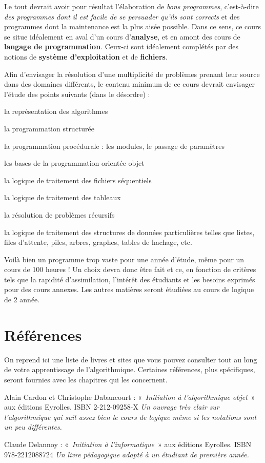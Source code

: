 	Le tout devrait avoir pour résultat l’élaboration de \textit{bons
	programmes}, c’est-à-dire \textit{des programmes dont il est facile de
	se persuader qu’ils sont corrects} et des programmes dont la
	maintenance est la plus aisée possible. Dans ce sens, ce cours se situe
	idéalement en aval d’un cours d’\textbf{analyse}, et en amont des cours
	de \textbf{langage de programmation}. Ceux-ci sont idéalement complétés
	par des notions de \textbf{système d’exploitation} et de
	\textbf{fichiers}.

	Afin d’envisager la résolution d’une multiplicité de problèmes prenant
	leur source dans des domaines différents, le contenu minimum de ce
	cours devrait envisager l’étude des points suivants (dans le désordre)
	:

	\begin{liste}
	\item 
		la représentation des algorithmes
	\item
		la programmation structurée
	\item
		la programmation procédurale : les modules, le passage de paramètres
	\item
		les bases de la programmation orientée objet
	\item
		la logique de traitement des fichiers séquentiels
	\item
		la logique de traitement des tableaux
	\item
		la résolution de problèmes récursifs
	\item
		la logique de traitement des structures de données particulières telles
		que listes, files d’attente, piles, arbres, graphes, tables de hachage,
		etc.
	\end{liste}

	Voilà bien un programme trop vaste pour une année d’étude, même pour un
	cours de 100 heures ! Un choix devra donc être fait et ce, en fonction
	de critères tels que la rapidité d’assimilation, l’intérêt des
	étudiants et les besoins exprimés pour des cours annexes. Les autres
	matières seront étudiées au cours de logique de 2
	année.

\section{Références}
	
	On reprend ici une liste de livres et sites que vous pouvez consulter
	tout au long de votre apprentissage de
	l'algorithmique. Certaines références, plus
	spécifiques, seront fournies avec les chapitres qui les concernent.

	\begin{liste}
	\item 
		Alain Cardon et Christophe Dabancourt : «~\textit{Initiation à
		l'algorithmique objet}~» aux éditions Eyrolles. ISBN
		2-212-09258-X
		\textit{Un ouvrage très clair sur l'algorithmique qui
		suit assez bien le cours de logique même si les notations sont un peu
		différentes.}
	\item
		Claude Delannoy : «~\textit{Initiation à
		l'informatique}~» aux éditions Eyrolles. 
		ISBN 978-2212088724
		\textit{Un livre pédagogique adapté à un étudiant de première année.}
	\end{liste}
